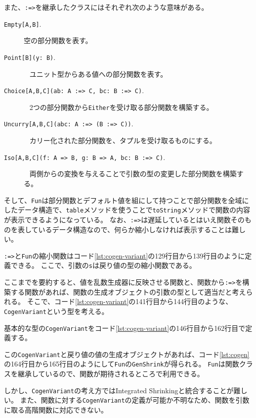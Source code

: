 \documentclass[submit,PRO]{ipsj}
\theoremstyle{definition}
\begin{document}
また、\texttt{:=>}を継承したクラスにはそれぞれ次のような意味がある。

\begin{description}
  \item[\texttt{Empty[A,B]}.] 空の部分関数を表す。
  \item[\texttt{Point[B](y:\ B)}.]~\newline
    ユニット型からある値への部分関数を表す。
  \item[\texttt{Choice[A,B,C](ab:\ A :=> C, bc:\ B :=> C)}.] ~\newline
    2つの部分関数から\texttt{Either}を受け取る部分関数を構築する。
  \item[\texttt{Uncurry[A,B,C](abc:\ A :=> (B :=> C))}.] ~\newline
    カリー化された部分関数を、タプルを受け取るものにする。
  \item[\texttt{Iso[A,B,C](f:\ A => B, g:\ B => A, bc:\ B :=> C)}.] ~\newline
    両側からの変換を与えることで引数の型の変更した部分関数を構築する。
\end{description}

そして、\texttt{Fun}は部分関数とデフォルト値を組にして持つことで部分関数を全域にしたデータ構造で、\texttt{table}メソッドを使うことで\texttt{toString}メソッドで関数の内容が表示できるようになっている。
なお、\texttt{:=>}は遅延しているとはいえ関数そのものを表しているデータ構造なので、何らか縮小しなければ表示することは難しい。

\texttt{:=>}と\texttt{Fun}の縮小関数はコード\ref{lst:cogen-variant}の129行目から139行目のように定義できる。
ここで、引数の\texttt{s}は戻り値の型の縮小関数である。

ここまでを要約すると、値を乱数生成器に反映させる関数と、関数から\texttt{:=>}を構築する関数があれば、関数の生成オブジェクトの引数の型として適当だと考えられる。
そこで、コード\ref{lst:cogen-variant}の141行目から144行目のような、\texttt{CogenVariant}という型を考える。

基本的な型の\texttt{CogenVariant}をコード\ref{lst:cogen-variant}の146行目から162行目で定義する。

この\texttt{CogenVariant}と戻り値の値の生成オブジェクトがあれば、コード\ref{lst:cogen}の164行目から165行目のようにして\texttt{Fun}の\texttt{GenShrink}が得られる。
\texttt{Fun}は関数クラスを継承しているので、関数が期待されるところで利用できる。

しかし、\texttt{CogenVariant}の考え方ではIntegrated Shrinkingと統合することが難しい。
また、関数に対する\texttt{CogenVariant}の定義が可能か不明なため、関数を引数に取る高階関数に対応できない。
\end{document}
